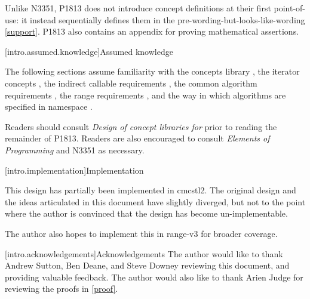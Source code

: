 Unlike N3351, P1813 does not introduce concept definitions at their first point-of-use: it instead
sequentially defines them in the pre-wording-but-looks-like-wording \ref{support}. P1813 also
contains an appendix for proving mathematical assertions.

[intro.assumed.knowledge]{Assumed knowledge}

The following sections assume familiarity with the concepts library , the
iterator concepts , the indirect callable requirements
, the common algorithm requirements , the range
requirements , and the way in which algorithms are specified in namespace
 .

Readers should consult \textit{Design of concept libraries for \Cpp{}}\cite{concept-design} prior to
reading the remainder of P1813. Readers are also encouraged to consult \textit{Elements of
Programming}\cite{EoP} and N3351 as necessary.

[intro.implementation]{Implementation}

This design has partially been implemented in cmcstl2. The original design and the ideas articulated
in this document have slightly diverged, but not to the point where the author is convinced that the
design has become un-implementable.

The author also hopes to implement this in range-v3 for broader coverage.

[intro.acknowledgements]{Acknowledgements}
The author would like to thank Andrew Sutton, Ben Deane, and Steve Downey reviewing this document, and
providing valuable feedback. The author would also like to thank Arien Judge for reviewing the proofs
in \ref{proof}.
